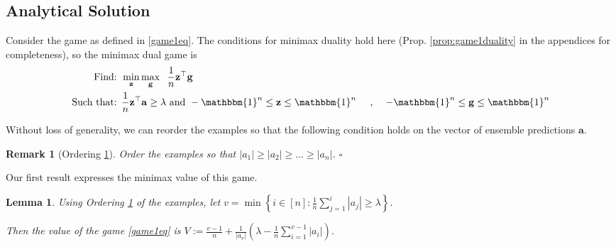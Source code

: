 \documentclass{article}[12pt]
\newtheorem{lem}[thm]{Lemma}
\theoremstyle{named}
\newtheorem{nremark}{Remark}
\newcommand{\ones}[1]{\mathbbm{1}^{#1}}
\newcommand{\va}{\mathbf{a}}
\newcommand{\vg}{\mathbf{g}}    %
\newcommand{\vz}{\mathbf{z}}
\newcommand{\abs}[1]{\left| #1 \right|}
\newcommand*{\qedinpw}{\hfill\ensuremath{\square}} %
\newcommand{\lrp}[1]{\left(#1\right)}
\begin{document}

\subsection{Analytical Solution}
\label{sec:game1analysis}

Consider the game as defined in \eqref{game1eq}. 
The conditions for minimax duality hold here (Prop. \ref{prop:game1duality} in the appendices for completeness), 
so the minimax dual game is
\begin{eqnarray}
\mbox{Find: }& \displaystyle \min_{\vz} \max_{\vg} \;\; \frac{1}{n} \vz^\top \vg  \label{game1dual}\\
\mbox{Such that: }& \frac{1}{n} \vz^\top \va \geq \lambda \mbox{ and } -\ones{n} \leq \vz \leq \ones{n} 
\notag\;\;\;\;\;,\;\;\;\; -\ones{n} \leq \vg \leq \ones{n} \notag
\end{eqnarray}

Without loss of generality, we can reorder the examples so that the
following condition holds on the vector of ensemble predictions $\va$.
\begin{nremark}[Ordering \ref{remark:regorder}]
\label{remark:regorder}
Order the examples so that $\displaystyle \abs{a_1} \geq \abs{a_2} \geq \dots \geq \abs{a_n}$. 
\qedinpw
\end{nremark}

Our first result expresses the minimax value of this game.

\begin{lem}
\label{lem:game1val}
Using Ordering \ref{remark:regorder} of the examples, 
let $v = \min \left\{ i \in [n] : \frac{1}{n} \sum_{j=1}^i \abs{a_j} \geq \lambda \right\}$. 

Then the value of the game \eqref{game1eq} is 
$\displaystyle V := \frac{v-1}{n} + \frac{1}{\abs{a_v}} \lrp{ \lambda - \frac{1}{n} \sum_{i=1}^{v-1} \abs{a_i} }$.
\end{lem}
\end{document}
